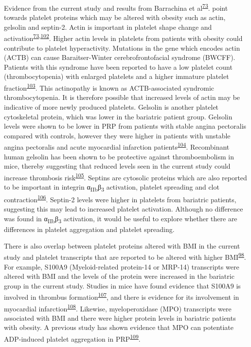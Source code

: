 \documentclass[11pt,twoside]{bristolthesis}
\begin{document}
Evidence from the current study and results from Barrachina et al\textsuperscript{\protect\hyperlink{ref-Barrachina2019}{73}}. point towards platelet proteins which may be altered with obesity such as actin, gelsolin and septin-2. Actin is important in platelet shape change and activation\textsuperscript{\protect\hyperlink{ref-Barrachina2019}{73},\protect\hyperlink{ref-Bearer2002}{102}}. Higher actin levels in platelets from patients with obesity could contribute to platelet hyperactivity. Mutations in the gene which encodes actin (ACTB) can cause Baraitser-Winter cerebrofrontofacial syndrome (BWCFF). Patients with this syndrome have been reported to have a low platelet count (thrombocytopenia) with enlarged platelets and a higher immature platelet fraction\textsuperscript{\protect\hyperlink{ref-Latham2018}{103}}. This actinopathy is known as ACTB-associated syndromic thrombocytopenia. It is therefore possible that increased levels of actin may be indicative of more newly produced platelets. Gelsolin is another platelet cytoskeletal protein, which was lower in the bariatric patient group. Gelsolin levels were shown to be lower in PRP from patients with stable angina pectoralis compared with controls, however they were higher in patients with unstable angina pectoralis and acute myocardial infarction patients\textsuperscript{\protect\hyperlink{ref-Yue2011}{104}}. Recombinant human gelsolin has been shown to be protective against thromboembolism in mice, thereby suggesting that reduced levels seen in the current study could increase thrombosis risk\textsuperscript{\protect\hyperlink{ref-Gupta2019}{105}}. Septins are cytosolic proteins which are also reported to be important in integrin α\textsubscript{IIb}β\textsubscript{3} activation, platelet spreading and clot contraction\textsuperscript{\protect\hyperlink{ref-Kim2020}{106}}. Septin-2 levels were higher in platelets from bariatric patients, suggesting this may lead to increased platelet activation. Although no difference was found in α\textsubscript{IIb}β\textsubscript{3} activation, it would be useful to explore whether there are differences in platelet aggregation and platelet spreading.

There is also overlap between platelet proteins altered with BMI in the current study and platelet transcripts that are reported to be altered with higher BMI\textsuperscript{\protect\hyperlink{ref-Freedman2010}{98}}. For example, S100A9 (Myeloid-related protein-14 or MRP-14) transcripts were altered with BMI and the levels of the protein were increased in the bariatric group in the current study. Studies in mice have found evidence that S100A9 is involved in thrombus formation\textsuperscript{\protect\hyperlink{ref-Wang2014a}{107}}, and there is evidence for its involvement in myocardial infarction\textsuperscript{\protect\hyperlink{ref-Cai2020}{108}}. Likewise, myeloperoxidase (MPO) transcripts were associated with BMI and there were higher protein levels in bariatric patients with obesity. A previous study has shown evidence that MPO can potentiate ADP-induced platelet aggregation in PRP\textsuperscript{\protect\hyperlink{ref-Gorudko2013}{109}}.
\end{document}
